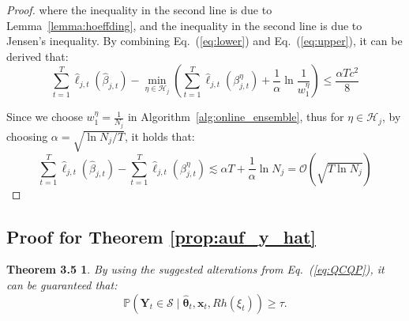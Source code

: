 \documentclass{article}
\theoremstyle{plain}
\newtheorem*{proposition35}{Theorem 3.5}
\theoremstyle{definition}
\theoremstyle{remark}
\def \Eq {Eq.}
\def \x {\mathbf{x}}
\def \sH {\mathcal{H}}
\def \sS {\mathcal{S}}
\def \Y {\mathbf{Y}}
\begin{document}
\begin{proof}
where the inequality in the second line is due to Lemma~\ref{lemma:hoeffding}, and the inequality in the second line is due to Jensen's inequality. 
By combining \Eq~(\ref{eq:lower}) and \Eq~(\ref{eq:upper}), it can be derived that: 
\[
  \sum_{t=1}^T \hat{\ell}_{j, t}\left(\hat{\beta}_{j, t}\right)-\min _{\eta \in \mathcal{H}_j}\left(\sum_{t=1}^T \hat{\ell}_{j, t}\left(\beta^\eta_{j, t}\right)+\frac{1}{\alpha} \ln \frac{1}{w_1^\eta}\right) \leq \frac{\alpha T c^2}{8}
\]

Since we choose $w_1^\eta = \frac{1}{N_j}$ in Algorithm~\ref{alg:online_ensemble}, thus for $\eta\in \sH_j$, by choosing $\alpha=\sqrt{\ln N_j/T}$, it holds that: 
\[
  \sum_{t=1}^T \hat{\ell}_{j, t}\left(\hat{\beta}_{j, t}\right)- \sum_{t=1}^T \hat{\ell}_{j, t}\left(\beta^\eta_{j, t}\right) \lesssim \alpha T + \frac{1}{\alpha} \ln N_j = \mathcal{O}\left(\sqrt{T\ln N_j}\right)
\]


\end{proof}



\subsection{Proof for Theorem \ref{prop:auf_y_hat}}
\label{app:constraint_construction}

\begin{proposition35}
  By using the suggested alterations from \Eq~(\ref{eq:QCQP}),
  it can be guaranteed that: 
  \vskip -0.15in
  \[
    \mathbb{P}\left(\Y_t\in\sS \mid \hat{\bm{\theta}}_t, \x_t, Rh(\xi_t)\right) \geq \tau. 
  \]
\end{proposition35}
\end{document}
